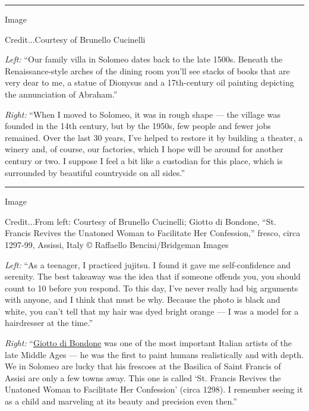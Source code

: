 \begin{center}\rule{0.5\linewidth}{\linethickness}\end{center}

Image

Credit...Courtesy of Brunello Cucinelli

\emph{Left:} ``Our family villa in Solomeo dates back to the late 1500s.
Beneath the Renaissance-style arches of the dining room you'll see
stacks of books that are very dear to me, a statue of Dionysus and a
17th-century oil painting depicting the annunciation of Abraham.''

\emph{Right:} ``When I moved to Solomeo, it was in rough shape --- the
village was founded in the 14th century, but by the 1950s, few people
and fewer jobs remained. Over the last 30 years, I've helped to restore
it by building a theater, a winery and, of course, our factories, which
I hope will be around for another century or two. I suppose I feel a bit
like a custodian for this place, which is surrounded by beautiful
countryside on all sides.''

\begin{center}\rule{0.5\linewidth}{\linethickness}\end{center}

Image

Credit...From left: Courtesy of Brunello Cucinelli; Giotto di Bondone,
``St. Francis Revives the Unatoned Woman to Facilitate Her Confession,''
fresco, circa 1297-99, Assissi, Italy © Raffaello Bencini/Bridgeman
Images

\emph{Left:} ``As a teenager, I practiced jujitsu. I found it gave me
self-confidence and serenity. The best takeaway was the idea that if
someone offends you, you should count to 10 before you respond. To this
day, I've never really had big arguments with anyone, and I think that
must be why. Because the photo is black and white, you can't tell that
my hair was dyed bright orange --- I was a model for a hairdresser at
the time.''

\emph{Right:}
``\href{https://www.nytimes3xbfgragh.onion/1937/01/17/archives/giotto-600-years-after-sexcentenary-of-death-of-the-painter-to-be.html}{Giotto
di Bondone} was one of the most important Italian artists of the late
Middle Ages --- he was the first to paint humans realistically and with
depth. We in Solomeo are lucky that his frescoes at the Basilica of
Saint Francis of Assisi are only a few towns away. This one is called
`St. Francis Revives the Unatoned Woman to Facilitate Her Confession'
(circa 1298). I remember seeing it as a child and marveling at its
beauty and precision even then.''

